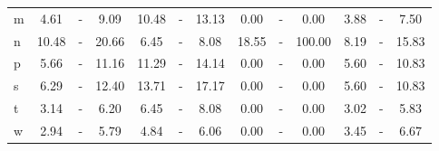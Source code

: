 \begin{table*}[h!]
\begin{center}
\begin{tabular}{  l | c   c   c | c   c   c | c   c   c | c   c   c  }
m & 4.61  & -  & 9.09  & 10.48  & -  & 13.13  & 0.00  & -  & 0.00  & 3.88  & -  & 7.50 \\
n & 10.48  & -  & 20.66  & 6.45  & -  & 8.08  & 18.55  & -  & 100.00  & 8.19  & -  & 15.83 \\
p & 5.66  & -  & 11.16  & 11.29  & -  & 14.14  & 0.00  & -  & 0.00  & 5.60  & -  & 10.83 \\\hline
s & 6.29  & -  & 12.40  & 13.71  & -  & 17.17  & 0.00  & -  & 0.00  & 5.60  & -  & 10.83 \\
t & 3.14  & -  & 6.20  & 6.45  & -  & 8.08  & 0.00  & -  & 0.00  & 3.02  & -  & 5.83 \\
w & 2.94  & -  & 5.79  & 4.84  & -  & 6.06  & 0.00  & -  & 0.00  & 3.45  & -  & 6.67 \\
\end{tabular}\end{center}
\end{table*}